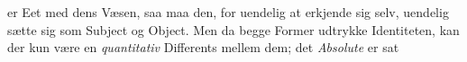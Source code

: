 \documentclass[12pt,a4paper]{book}
\renewcommand{\thefootnote}{%
  \ifcase\value{footnote}\or *)\or **)\or ***)\or \dag)\or \dag\dag)\else
  \arabic{footnote})\fi}
\newcommand{\dblrule}{\begin{center}%
  \rule{2cm}{0.4pt}\\[1.2pt]\rule{2cm}{0.4pt}\end{center}}
\begin{document}
er Eet med dens Væsen, saa maa den, for uendelig at erkjende
sig selv, uendelig sætte sig som Subject og Object. Men da
begge Former udtrykke Identiteten, kan der kun være en
\emph{quantitativ} Differents mellem dem; det \emph{Absolute} er sat





%

%
\end{document}
